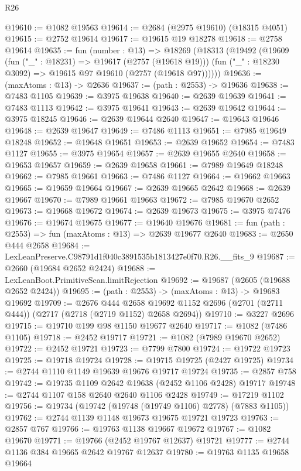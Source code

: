 \begin{lexlean}{R26}
\begin{coremodule}
@19610 := @1082 @19563
@19614 := @2684 (@2975 @19610) (@18315 @4051)
@19615 := @2752 @19614
@19617 := @19615 @19 @18278
@19618 := @2758 @19614
@19635 := fun (number : @13) =>
  @18269
    (@18313
      (@19492
        (@19609
          (fun ("_" : @18231) => @19617 (@2757 (@19618 @19)))
          (fun ("_" : @18230 @3092) => @19615 @97 @19610 (@2757 (@19618 @97))))))
@19636 := (maxAtoms : @13) -> @2636
@19637 := (path : @2553) -> @19636
@19638 := @7483 @1105
@19639 := @3975 @19638
@19640 := @2639 @19639
@19641 := @7483 @1113
@19642 := @3975 @19641
@19643 := @2639 @19642
@19644 := @3975 @18245
@19646 := @2639 @19644 @2640
@19647 := @19643 @19646
@19648 := @2639 @19647
@19649 := @7486 @1113
@19651 := @7985 @19649 @18248
@19652 := @19648 @19651
@19653 := @2639 @19652
@19654 := @7483 @1127
@19655 := @3975 @19654
@19657 := @2639 @19655 @2640
@19658 := @19653 @19657
@19659 := @2639 @19658
@19661 := @7989 @19649 @18248
@19662 := @7985 @19661
@19663 := @7486 @1127
@19664 := @19662 @19663
@19665 := @19659 @19664
@19667 := @2639 @19665 @2642
@19668 := @2639 @19667
@19670 := @7989 @19661 @19663
@19672 := @7985 @19670 @2652
@19673 := @19668 @19672
@19674 := @2639 @19673
@19675 := @3975 @7476
@19676 := @19674 @19675
@19677 := @19640 @19676
@19681 := fun (path : @2553) => fun (maxAtoms : @13) => @2639 @19677 @2640
@19683 := @2650 @444 @2658
@19684 := LexLeanPreserve.C98791d1f040c3891535b1813427e0f70.R26.__fits_9
@19687 := @2660 (@19684 @2652 @2424)
@19688 := LexLeanBoot.PrimitiveScan.limitRejection
@19692 := @19687 (@2605 (@19688 @2652 @2424))
@19695 := (path : @2553) -> (maxAtoms : @13) -> @19683 @19692
@19709 := @2676
    @444
    @2658
    @19692
    @1152
    @2696
    (@2701 (@2711 @444))
    (@2717 (@2718 (@2719 @1152) @2658 @2694))
@19710 := @3227 @2696
@19715 := @19710 @199 @98 @1150 @19677 @2640
@19717 := @1082 (@7486 @1105)
@19718 := @2452 @19717
@19721 := @1082 (@7989 @19670 @2652)
@19722 := @2452 @19721
@19723 := @7799 @7800
@19724 := @19722 @19723
@19725 := @19718 @19724
@19728 := @19715 @19725 (@2427 @19725)
@19734 := @2744 @1110 @1149 @19639 @19676 @19717 @19724
@19735 := @2857 @758
@19742 := @19735 @1109 @2642 @19638 (@2452 @1106 @2428) @19717
@19748 := @2744 @1107 @158 @2640 @2640 @1106 @2428
@19749 := @17219 @1102
@19756 := @19734 (@19742 (@19748 (@19749 @1106) @2778) (@7883 @1105))
@19762 := @2744 @1139 @1148 @19673 @19675 @19721 @19723
@19763 := @2857 @767
@19766 := @19763 @1138 @19667 @19672
@19767 := @1082 @19670
@19771 := @19766 (@2452 @19767 @12637) @19721
@19777 := @2744 @1136 @384 @19665 @2642 @19767 @12637
@19780 := @19763 @1135 @19658 @19664

\end{coremodule}
\end{lexlean}
